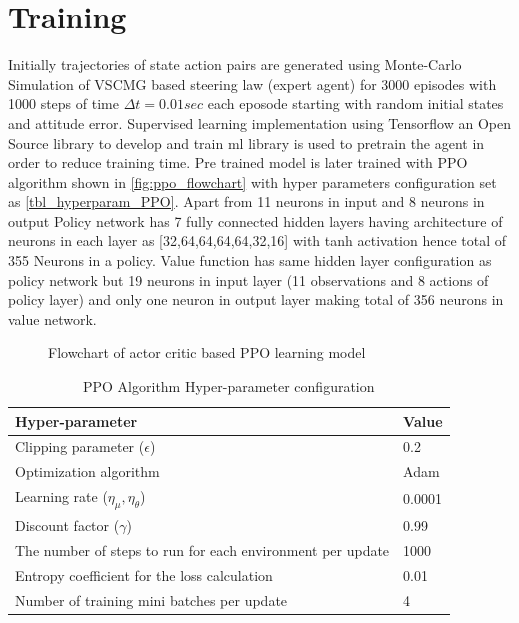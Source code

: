 \section{Training}
Initially trajectories of state action pairs are generated using Monte-Carlo Simulation of VSCMG based steering law (expert agent) for 3000 episodes with 1000 steps of time $\Delta t=0.01sec$ each eposode starting with random initial states and attitude error. Supervised learning implementation using Tensorflow \cite{tensorflow2015-whitepaper} an Open Source library to develop and train  \acrshort{ml} library is used to pretrain the agent in order to reduce training time. Pre trained model is later trained with PPO algorithm shown in \autoref{fig:ppo_flowchart} with hyper parameters configuration set as \autoref{tbl_hyperparam_PPO}. Apart from 11 neurons in input and 8 neurons in output Policy network has 7 fully connected hidden layers having architecture of neurons in each layer as [32,64,64,64,64,32,16] with tanh activation hence total of 355 Neurons in a policy. Value function has same hidden layer configuration as policy network but 19 neurons in input layer (11 observations and 8 actions of policy layer) and only one neuron in output layer making total of 356 neurons in value network.

\begin{figure}[H]
    \centering
    \scalebox{0.75}{}
    \caption{Flowchart of actor critic based PPO learning model \cite{LimHun_ppo_flowchart}}
    \label{fig:ppo_flowchart}
\end{figure}

\begin{table}[H]
\centering
        
\begin{tabular}{p{}|p{}}
\toprule
 Hyper-parameter & Value \\
\midrule
 Clipping parameter ($\displaystyle \epsilon $) & 0.2 \\
\hline 
 Optimization algorithm & Adam \\
\hline 
 Learning rate ($\displaystyle \eta _{\mu } ,\eta _{\theta }$) & 0.0001 \\
\hline 
 Discount factor ($\displaystyle \gamma $) & 0.99 \\
\hline 
 The number of steps to run for each environment per update & 1000 \\
\hline 
 Entropy coefficient for the loss calculation & 0.01 \\
\hline 
 Number of training mini batches per update & 4 \\
 \bottomrule
\end{tabular}
\caption{PPO Algorithm Hyper-parameter configuration}
\label{tbl_hyperparam_PPO}
\end{table}

